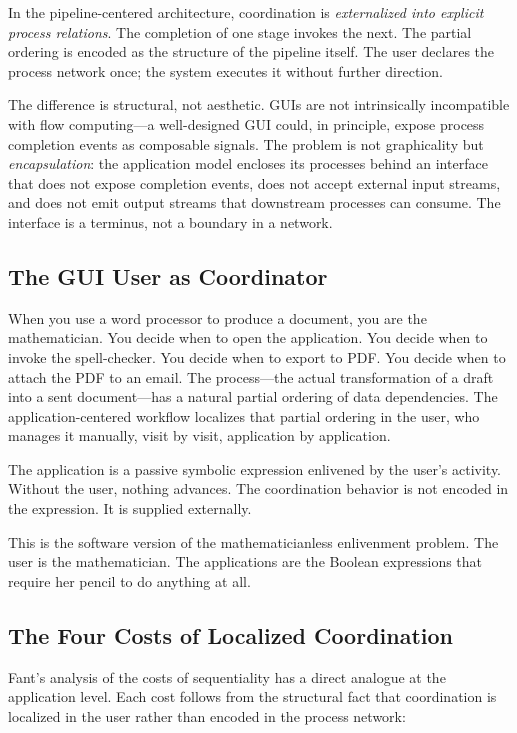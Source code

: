 \documentclass[12pt, a4paper]{article}
\begin{document}
In the pipeline-centered architecture, coordination is
\emph{externalized into explicit process relations}. The completion
of one stage invokes the next. The partial ordering is encoded as
the structure of the pipeline itself. The user declares the process
network once; the system executes it without further direction.

The difference is structural, not aesthetic. GUIs are not
intrinsically incompatible with flow computing---a well-designed
GUI could, in principle, expose process completion events as
composable signals. The problem is not graphicality but
\emph{encapsulation}: the application model encloses its processes
behind an interface that does not expose completion events, does not
accept external input streams, and does not emit output streams that
downstream processes can consume. The interface is a terminus, not a
boundary in a network.

\subsection{The GUI User as Coordinator}

When you use a word processor to produce a document, you are the
mathematician. You decide when to open the application. You decide
when to invoke the spell-checker. You decide when to export to PDF.
You decide when to attach the PDF to an email. The process---the
actual transformation of a draft into a sent document---has a natural
partial ordering of data dependencies. The application-centered
workflow localizes that partial ordering in the user, who manages it
manually, visit by visit, application by application.

The application is a passive symbolic expression enlivened by the
user's activity. Without the user, nothing advances. The coordination
behavior is not encoded in the expression. It is supplied externally.

This is the software version of the mathematicianless enlivenment
problem. The user is the mathematician. The applications are the
Boolean expressions that require her pencil to do anything at all.

\subsection{The Four Costs of Localized Coordination}

Fant's analysis of the costs of sequentiality has a direct analogue
at the application level. Each cost follows from the structural fact
that coordination is localized in the user rather than encoded in the
process network:
\end{document}
